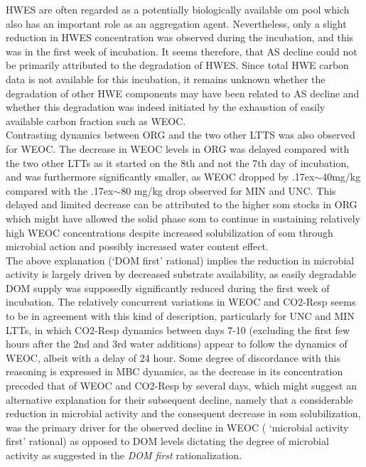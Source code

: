 	HWES are often regarded as a potentially biologically available \gls{om} pool which also has an important role as an aggregation agent. Nevertheless, only a slight reduction in HWES concentration was observed during the incubation, and this was in the first week of incubation. It seems therefore, that AS decline could not be primarily attributed to the degradation of HWES. Since total HWE carbon data is not available for this incubation, it remains unknown whether the degradation of other HWE components may have been related to AS decline and whether this degradation was indeed initiated by  the exhaustion of easily available carbon fraction such as WEOC.\\
	\hypertarget{weoc_decrease}{}
	Contrasting dynamics between ORG and the two other LTTS was also observed for WEOC. The decrease in WEOC levels in ORG was delayed compared with the two other LTTs as it started on the 8th and not the 7th day of incubation, and was furthermore significantly smaller, as WEOC dropped by {\raise.17ex\hbox{$\scriptstyle\mathtt{\sim}$}}40mg/kg compared with the {\raise.17ex\hbox{$\scriptstyle\mathtt{\sim}$}}80 mg/kg drop observed for MIN and UNC. This delayed and limited decrease can be attributed to the higher \gls{som} stocks in ORG which might have allowed the solid phase \gls{som} to continue in sustaining relatively high WEOC concentrations despite increased solubilization of \gls{som} through microbial action and possibly increased water content effect.\\
	The above explanation (‘DOM first’ rational) implies  the reduction in microbial activity is largely driven by decreased substrate availability, as easily degradable DOM supply was supposedly significantly reduced during the first week of incubation. The relatively concurrent variations in WEOC and CO2-Resp seems to be in agreement with this kind of description, particularly for UNC and MIN LTTs, in which CO2-Resp dynamics between days 7-10 (excluding the first few hours after the 2nd and 3rd water additions) appear to follow the dynamics of WEOC, albeit with a delay of 24 hour. Some  degree of discordance with this reasoning is expressed in MBC dynamics, as the decrease in its concentration preceded that of WEOC and  CO2-Resp by several days, which might suggest an alternative explanation for their subsequent decline, namely that a considerable reduction in microbial activity and the consequent decrease in \gls{som} solubilization, was the primary driver for the observed decline in WEOC ( ‘microbial activity first’ rational) as opposed to DOM levels dictating the degree of microbial activity as suggested in the \textit{DOM first} rationalization.\\
